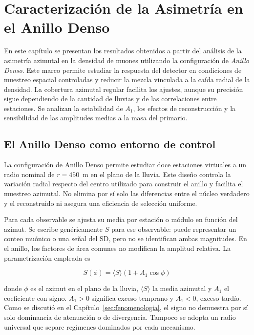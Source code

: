 
\section{Caracterización de la Asimetría en el Anillo Denso}
\label{sec:cap_anillo_denso}

En este capítulo se presentan los resultados obtenidos a partir del análisis de la asimetría azimutal en la densidad de muones utilizando la configuración de \textit{Anillo Denso}. Este marco permite estudiar la respuesta del detector en condiciones de muestreo espacial controladas y reducir la mezcla vinculada a la caída radial de la densidad. La cobertura azimutal regular facilita los ajustes, aunque su precisión sigue dependiendo de la cantidad de lluvias y de las correlaciones entre estaciones. Se analizan la estabilidad de $A_1$, los efectos de reconstrucción y la sensibilidad de las amplitudes medias a la masa del primario.

\subsection{El Anillo Denso como entorno de control}
\label{subsec:entorno_control}

La configuración de Anillo Denso permite estudiar doce estaciones virtuales a un radio nominal de $r=450$~m en el plano de la lluvia. Este diseño controla la variación radial respecto del centro utilizado para construir el anillo y facilita el muestreo azimutal. No elimina por sí solo las diferencias entre el núcleo verdadero y el reconstruido ni asegura una eficiencia de selección uniforme.

Para cada observable se ajusta su media por estación o módulo en función del azimut. Se escribe genéricamente $S$ para ese observable: puede representar un conteo muónico o una señal del SD, pero no se identifican ambas magnitudes. En el anillo, los factores de área comunes no modifican la amplitud relativa. La parametrización empleada es

\begin{equation}
	S(\phi) = \langle S \rangle (1 + A_1 \cos\phi)
	\label{eq:ajuste_armonico}
\end{equation}

donde $\phi$ es el azimut en el plano de la lluvia, $\langle S\rangle$ la media azimutal y $A_1$ el coeficiente con signo. $A_1>0$ significa exceso temprano y $A_1<0$, exceso tardío. Como se discutió en el Capítulo~\ref{sec:fenomenologia}, el signo no demuestra por sí solo dominancia de atenuación o de divergencia. Tampoco se adopta un radio universal que separe regímenes dominados por cada mecanismo.

